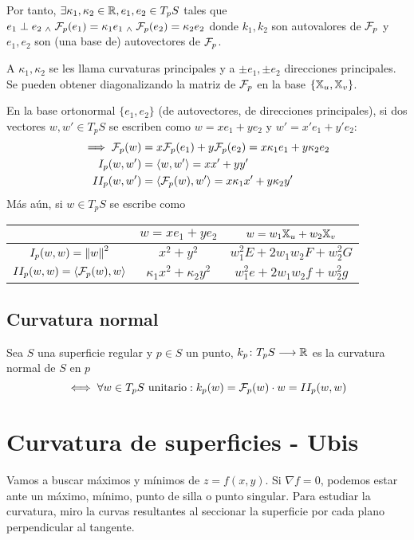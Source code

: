 Por tanto, $\exists \kappa_1, \kappa_2 \in \mathbb{R}, e_1, e_2 \in T_pS$ tales que $e_1 \perp e_2 \; _{\wedge} \; \mathcal{F}_p(e_1) = \kappa_1e_1 \; _{\wedge} \; \mathcal{F}_p(e_2) = \kappa_2e_2$ donde $k_1, k_2$ son autovalores de $\mathcal{F}_p$ y $e_1, e_2$ son (una base de) autovectores de $\mathcal{F}_p$.

A $\kappa_1, \kappa_2$ se les llama curvaturas principales y a $\pm e_1, \pm e_2$ direcciones principales. Se pueden obtener diagonalizando la matriz de $\mathcal{F}_p$ en la base $\{\mathbb{X}_u, \mathbb{X}_v\}$.

En la base ortonormal $\{e_1, e_2\}$ (de autovectores, de direcciones principales), si dos vectores $w, w' \in T_pS$ se escriben como $w = xe_1 + ye_2$ y $w'=x'e_1 + y'e_2$:
\[\begin{aligned}
	\implies \mathcal{F}_p(w) &= x\mathcal{F}_p(e_1) + y\mathcal{F}_p(e_2) = x\kappa_1e_1 + y\kappa_2e_2\\
	I_p(w, w') &= \langle w, w' \rangle = xx' + yy'\\
	II_p(w, w') &= \langle \mathcal{F}_p(w), w' \rangle = x\kappa_1x' + y\kappa_2y'
\end{aligned}\]
Más aún, si $w \in T_pS$ se escribe como
\begin{center}
\begin{tabular}{c|c|c}
	& $w = xe_1 + ye_2$ & $w = w_1\mathbb{X}_u + w_2\mathbb{X}_v$ \\
	\hline
	$I_p(w, w) = \left\Vert w\right\Vert^2$ & $x^2 + y^2$ & $w_1^2E + 2w_1w_2F + w_2^2G$ \\
	$II_p(w, w) = \langle \mathcal{F}_p(w), w \rangle$ & $\kappa_1x^2 + \kappa_2y^2$ & $w_1^2e + 2w_1w_2f + w_2^2g$
\end{tabular}
\end{center}

\subsection{Curvatura normal}
\begin{defn}
	Sea $S$ una superficie regular y $p \in S$ un punto, $k_p \colon T_pS \longrightarrow \mathbb{R}$ es la curvatura normal de $S$ en $p$ \[\iff \forall w \in T_pS \text{ unitario} : k_p(w) = \mathcal{F}_p(w) \cdot w = II_p(w, w)\]
\end{defn}

\pagebreak
\section{Curvatura de superficies - Ubis}

Vamos a buscar máximos y mínimos de $z = f(x,y)$. Si $\nabla f = 0$, podemos estar ante un máximo, mínimo, punto de silla o punto singular. Para estudiar la curvatura, miro la curvas resultantes al seccionar la superficie por cada plano perpendicular al tangente.

